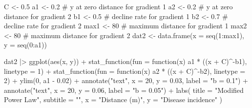 \documentclass[
  letterpaper,
  DIV=11,
  numbers=noendperiod]{scrreprt}
\newenvironment{Shaded}{\begin{snugshade}}{\end{snugshade}}
\newcommand{\AttributeTok}[1]{\textcolor[rgb]{0.40,0.45,0.13}{#1}}
\newcommand{\CommentTok}[1]{\textcolor[rgb]{0.37,0.37,0.37}{#1}}
\newcommand{\ControlFlowTok}[1]{\textcolor[rgb]{0.00,0.23,0.31}{#1}}
\newcommand{\DecValTok}[1]{\textcolor[rgb]{0.68,0.00,0.00}{#1}}
\newcommand{\FloatTok}[1]{\textcolor[rgb]{0.68,0.00,0.00}{#1}}
\newcommand{\FunctionTok}[1]{\textcolor[rgb]{0.28,0.35,0.67}{#1}}
\newcommand{\NormalTok}[1]{\textcolor[rgb]{0.00,0.23,0.31}{#1}}
\newcommand{\OtherTok}[1]{\textcolor[rgb]{0.00,0.23,0.31}{#1}}
\newcommand{\SpecialCharTok}[1]{\textcolor[rgb]{0.37,0.37,0.37}{#1}}
\newcommand{\StringTok}[1]{\textcolor[rgb]{0.13,0.47,0.30}{#1}}
\begin{document}
\begin{Shaded}
\begin{Highlighting}[]
\NormalTok{C }\OtherTok{\textless{}{-}} \FloatTok{0.5}
\NormalTok{a1 }\OtherTok{\textless{}{-}} \FloatTok{0.2} \CommentTok{\# y at zero distance for gradient 1}
\NormalTok{a2 }\OtherTok{\textless{}{-}} \FloatTok{0.2} \CommentTok{\# y at zero distance for gradient 2}
\NormalTok{b1 }\OtherTok{\textless{}{-}} \FloatTok{0.5} \CommentTok{\# decline rate for gradient 1}
\NormalTok{b2 }\OtherTok{\textless{}{-}} \FloatTok{0.7} \CommentTok{\# decline rate for gradient 2}
\NormalTok{max1 }\OtherTok{\textless{}{-}} \DecValTok{80} \CommentTok{\# maximum distance for gradient 1}
\NormalTok{max2 }\OtherTok{\textless{}{-}} \DecValTok{80} \CommentTok{\# maximum distance for gradient 2}
\NormalTok{dat2 }\OtherTok{\textless{}{-}} \FunctionTok{data.frame}\NormalTok{(}\AttributeTok{x =} \FunctionTok{seq}\NormalTok{(}\DecValTok{1}\SpecialCharTok{:}\NormalTok{max1), }\AttributeTok{y =} \FunctionTok{seq}\NormalTok{(}\DecValTok{0}\SpecialCharTok{:}\NormalTok{a1))}


\NormalTok{dat2 }\SpecialCharTok{|\textgreater{}}
  \FunctionTok{ggplot}\NormalTok{(}\FunctionTok{aes}\NormalTok{(x, y)) }\SpecialCharTok{+}
  \FunctionTok{stat\_function}\NormalTok{(}\AttributeTok{fun =} \ControlFlowTok{function}\NormalTok{(x) a1 }\SpecialCharTok{*}\NormalTok{ ((x }\SpecialCharTok{+}\NormalTok{ C)}\SpecialCharTok{\^{}{-}}\NormalTok{b1), }\AttributeTok{linetype =} \DecValTok{1}\NormalTok{) }\SpecialCharTok{+}
  \FunctionTok{stat\_function}\NormalTok{(}\AttributeTok{fun =} \ControlFlowTok{function}\NormalTok{(x) a2 }\SpecialCharTok{*}\NormalTok{ ((x }\SpecialCharTok{+}\NormalTok{ C)}\SpecialCharTok{\^{}{-}}\NormalTok{b2), }\AttributeTok{linetype =} \DecValTok{2}\NormalTok{) }\SpecialCharTok{+}
  \FunctionTok{ylim}\NormalTok{(}\DecValTok{0}\NormalTok{, a1 }\SpecialCharTok{{-}} \FloatTok{0.02}\NormalTok{) }\SpecialCharTok{+}
  \FunctionTok{annotate}\NormalTok{(}\StringTok{"text"}\NormalTok{, }\AttributeTok{x =} \DecValTok{20}\NormalTok{, }\AttributeTok{y =} \FloatTok{0.03}\NormalTok{, }\AttributeTok{label =} \StringTok{"b = 0.1"}\NormalTok{) }\SpecialCharTok{+}
  \FunctionTok{annotate}\NormalTok{(}\StringTok{"text"}\NormalTok{, }\AttributeTok{x =} \DecValTok{20}\NormalTok{, }\AttributeTok{y =} \FloatTok{0.06}\NormalTok{, }\AttributeTok{label =} \StringTok{"b = 0.05"}\NormalTok{) }\SpecialCharTok{+}
  \FunctionTok{labs}\NormalTok{(}
    \AttributeTok{title =} \StringTok{"Modified Power Law"}\NormalTok{,}
    \AttributeTok{subtitle =} \StringTok{""}\NormalTok{,}
    \AttributeTok{x =} \StringTok{"Distance (m)"}\NormalTok{,}
    \AttributeTok{y =} \StringTok{"Disease incidence"}
\NormalTok{  )}
\end{Highlighting}
\end{Shaded}
\end{document}
